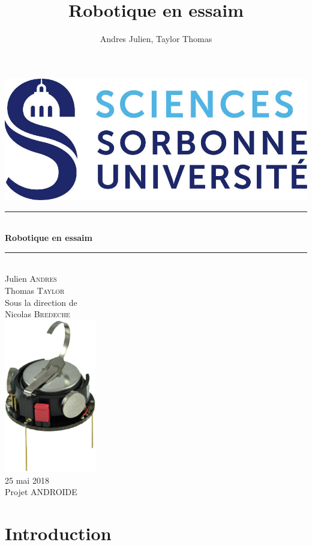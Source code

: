 \documentclass[a4paper]{article}
\title{Robotique en essaim}
\author{Andres Julien, Taylor Thomas}
\newcommand{\HRule}{\rule{\linewidth}{0.5mm}} %
\begin{document}
\begin{titlepage}
\center
\includegraphics{incl/logo_sorbonne}\\[1cm] 

\HRule \\[0.4cm]
{ \huge \bfseries Robotique en essaim}\\[0.4cm] %
\HRule \\[1.5cm]



Julien \textsc{Andres}\\ %
Thomas \textsc{Taylor}\\[3cm]
Sous la direction de \\
Nicolas \textsc{Bredeche}\\[2cm]


\includegraphics[width=4cm]{incl/Kilobots.png}\\[2cm]


25 mai 2018\\
Projet ANDROIDE

\end{titlepage}

\newpage
\renewcommand{\contentsname}{Sommaire}
\tableofcontents
\newpage
\section{Introduction}
\end{document}
